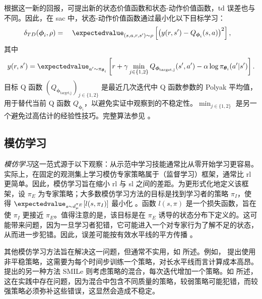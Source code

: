 根据这一新的回报，可提出新的状态价值函数和状态-动作价值函数，\gls{td} 误差也与  不同。因此，在 \gls{sac} 中，状态-动作价值函数通过最小化以下目标学习：
\begin{align}
\label{eq:update_sac}
    \delta_{TD}(\boldsymbol\phi_i,\rho) &= \quad\expectedvalue_{(s,a,r,s')\sim\rho}\left[\left(y(r,s') - Q_{\boldsymbol\phi_{i}}(s,a)\right)^2\right],
\end{align}
其中
\begin{align*}
    y(r,s') = \expectedvalue_{a'\sim\pi_{\boldsymbol\theta_{i}}}\left[r+\gamma \min_{j\in\{1,2\}}Q_{\boldsymbol\phi_{\text{target,j}}}(s',a')-\alpha \log\pi_{\boldsymbol\theta_{i}}(a'\vert s') \right].
\end{align*}
目标 Q 函数 $(Q_{\boldsymbol\phi_{\text{target,j}}})_{j\in\{1,2\}}$ 是最近几次迭代中 Q 函数参数的 Polyak 平均值，用于替代当前 Q 函数 $Q_{\boldsymbol\phi_i}$，以避免实证中观察到的不稳定性。$\textstyle\min_{j\in\{1,2\}}$ 是另一个避免过高估计的经验性技巧。完整算法参见 \cite{haarnoja2018soft}。

\subsection{模仿学习}
\label{subsec:imitation_learning}
\emph{模仿学习}这一范式源于以下观察：从示范中学习技能通常比从零开始学习更容易。实际上，在固定的观测集上学习模仿专家策略属于\emph{}（监督学习）框架，通常比 \gls{rl} 更简单。因此，模仿学习旨在缩小 \gls{rl} 与 \gls{sl} 之间的差距。为更形式化地定义该框架，设 $\pi_E$ 为专家策略；大多数模仿学习方法的目标是找到学习者的策略 $\pi_I$，使得 $\textstyle\expectedvalue_{s\sim d_\mu^{\pi_E}}[l(s,\pi_I)]$ 最小化 \cite{ross2011reduction}。函数 $l(s,\pi)$ 是一个损失函数，旨在使 $\pi_I$ 更接近 $\pi_E$。值得注意的是，该目标是在 $\pi_E$ 诱导的状态分布下定义的。这可能带来问题，因为一旦学习者犯错，它可能进入一个对专家行为了解不足的状态，从而进一步犯错。因此，误差可能按有效水平线的平方传播 \cite[Theorem~2.1]{ross2010efficient}\cite[Theorem~1]{xu2020error}。

其他模仿学习方法旨在解决这一问题，但通常不实用，如 \cite{ross2011reduction} 所述。例如，\cite{ross2010efficient} 提出使用非平稳策略，这需要为每个时间步训练一个策略，对长水平线而言计算成本高昂。\cite{ross2010efficient} 提出的另一种方法 SMILe 则考虑策略的混合，每次迭代增加一个策略。如 \cite{ross2011reduction} 所述，这在实践中存在问题，因为混合中包含不同质量的策略，较弱策略可能犯错，而较强策略必须弥补这些错误，这显然会造成不稳定。

